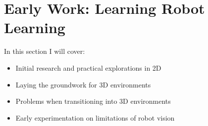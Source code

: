\chapter{Early Work: Learning Robot Learning}\label{ch:early-work}
In this section I will cover:
  \begin{itemize}
    \item Initial research and practical explorations in 2D 
    \item Laying the groundwork for 3D environments
    \item Problems when transitioning into 3D environments
    \item Early experimentation on limitations of robot vision
  \end{itemize}


